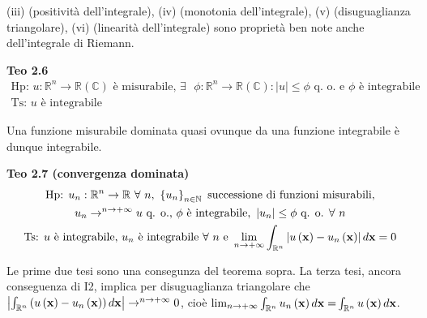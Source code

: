 \documentclass{article}
\begin{document}
(iii) (positivit\`{a} dell'integrale), (iv) (monotonia dell'integrale), (v)
(disuguaglianza triangolare), (vi) (linearit\`{a} dell'integrale) sono
propriet\`{a} ben note anche dell'integrale di Riemann.

\textbf{Teo 2.6}%
\begin{gather*}
\text{Hp: }u:%
\mathbb{R}
^{n}\rightarrow 
\mathbb{R}
\left( 
\mathbb{C}
\right) \text{ \`{e} misurabile, }\exists \text{ }\phi :%
\mathbb{R}
^{n}\rightarrow 
\mathbb{R}
\left( 
\mathbb{C}
\right) :\left\vert u\right\vert \leq \phi \text{ q. o. e }\phi \text{ \`{e}
integrabile} \\
\text{Ts: }u\text{ \`{e} integrabile}
\end{gather*}

Una funzione misurabile dominata quasi ovunque da una funzione integrabile 
\`{e} dunque integrabile.

\textbf{Teo 2.7 (convergenza dominata)} 
\begin{gather*}
\text{Hp: }u_{n}:%
\mathbb{R}
^{n}\rightarrow 
\mathbb{R}
\text{ }\forall \text{ }n\text{, }\left\{ u_{n}\right\} _{n\in 
\mathbb{N}
}\text{ successione di funzioni misurabili,} \\
u_{n}\rightarrow ^{n\rightarrow +\infty }u\text{ q. o., }\phi \text{ \`{e}
integrabile, }\left\vert u_{n}\right\vert \leq \phi \text{ q. o. }\forall 
\text{ }n \\
\text{Ts: }u\text{ \`{e} integrabile, }u_{n}\text{ \`{e} integrabile }%
\forall \text{ }n\text{ e }\lim_{n\rightarrow +\infty }\int_{%
\mathbb{R}
^{n}}\left\vert u\left( \mathbf{x}\right) -u_{n}\left( \mathbf{x}\right)
\right\vert d\mathbf{x}=0
\end{gather*}

Le prime due tesi sono una consegunza del teorema sopra. La terza tesi,
ancora conseguenza di I2, implica per disuguaglianza triangolare che $%
\left\vert \int_{%
\mathbb{R}
^{n}}\left( u\left( \mathbf{x}\right) -u_{n}\left( \mathbf{x}\right) \right)
d\mathbf{x}\right\vert \rightarrow ^{n\rightarrow +\infty }0$, cio\`{e} $%
\lim_{n\rightarrow +\infty }\int_{%
\mathbb{R}
^{n}}u_{n}\left( \mathbf{x}\right) d\mathbf{x=}\int_{%
\mathbb{R}
^{n}}u\left( \mathbf{x}\right) d\mathbf{x}$.
\end{document}
